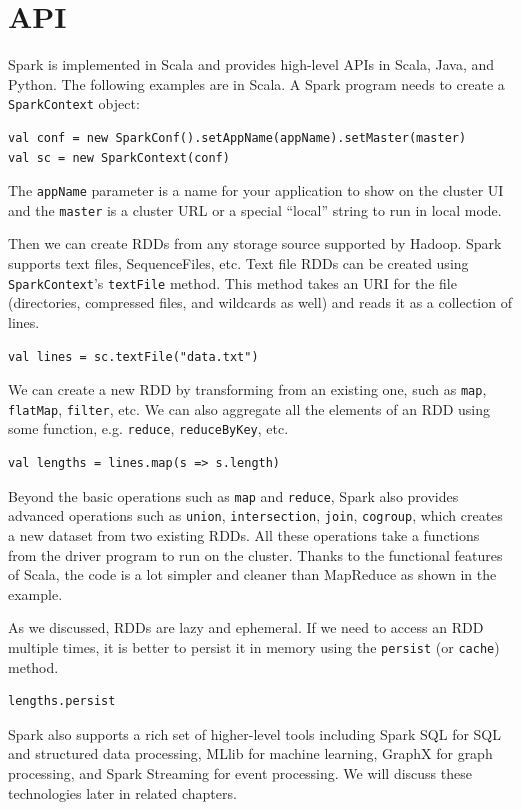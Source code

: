 \documentclass[12pt]{book}
\begin{document}
\section{API}
Spark is implemented in Scala and provides high-level APIs in Scala, Java, and Python. The following examples are in Scala. A Spark program needs to create a \texttt{SparkContext} object:
\begin{lstlisting}
val conf = new SparkConf().setAppName(appName).setMaster(master)
val sc = new SparkContext(conf)
\end{lstlisting}
The \texttt{appName} parameter is a name for your application to show on the cluster UI and the \texttt{master} is a cluster URL or a special ``local'' string to run in local mode.

Then we can create RDDs from any storage source supported by Hadoop. Spark supports text files, SequenceFiles, etc.
Text file RDDs can be created using \texttt{SparkContext}'s \texttt{textFile} method. This method takes an URI for the file (directories, compressed files, and wildcards as well) and reads it as a collection of lines.
\begin{lstlisting}
val lines = sc.textFile("data.txt")
\end{lstlisting}

We can create a new RDD by transforming from an existing one, such as \texttt{map}, \texttt{flatMap}, \texttt{filter}, etc. We can also aggregate all the elements of an RDD using some function, e.g. \texttt{reduce}, \texttt{reduceByKey}, etc.
\begin{lstlisting}
val lengths = lines.map(s => s.length)
\end{lstlisting}
Beyond the basic operations such as \texttt{map} and \texttt{reduce}, Spark also provides advanced operations such as \texttt{union}, \texttt{intersection}, \texttt{join}, \texttt{cogroup}, which creates a new dataset from two existing RDDs.
All these operations take a functions from the driver program to run on the cluster. Thanks to the functional features of Scala, the code is a lot simpler and cleaner than MapReduce as shown in the example.

As we discussed, RDDs are lazy and ephemeral. If we need to access an RDD multiple times, it is better to persist it in memory using the \texttt{persist} (or \texttt{cache}) method.
\begin{lstlisting}
lengths.persist
\end{lstlisting}

Spark also supports a rich set of higher-level tools including Spark SQL for SQL and structured data processing, MLlib for machine learning, GraphX for graph processing, and Spark Streaming for event processing. We will discuss these technologies later in related chapters. 
\end{document}

